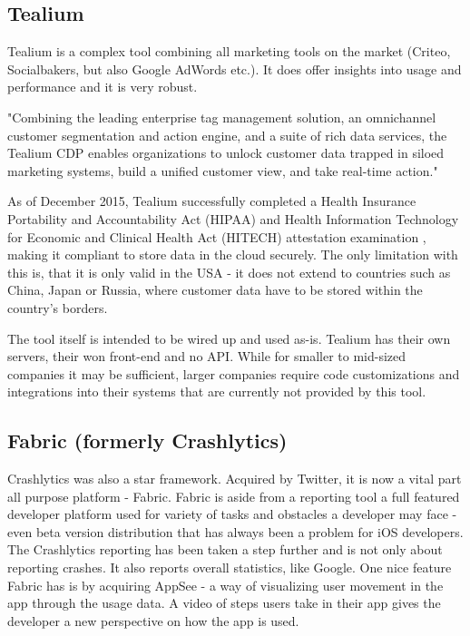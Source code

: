 \subsection{Tealium}

Tealium is a complex tool combining all marketing tools on the market (Criteo, Socialbakers, but also Google AdWords etc.). It does offer insights into usage and performance and it is very robust. 

\bigbreak

"Combining the leading enterprise tag management solution, an omnichannel customer segmentation and action engine, and a suite of rich data services, the Tealium CDP enables organizations to unlock customer data trapped in siloed marketing systems, build a unified customer view, and take real-time action." \cite{tealium}

\bigbreak

As of December 2015, Tealium successfully completed a Health Insurance Portability and Accountability Act (HIPAA) and Health Information Technology for Economic and Clinical Health Act (HITECH) attestation examination \cite{hipaa}, making it compliant to store data in the cloud securely. The only limitation with this is, that it is only valid in the USA - it does not extend to countries such as China, Japan or Russia, where customer data have to be stored within the country's borders.

The tool itself is intended to be wired up and used as-is. Tealium has their own servers, their won front-end and no API. While for smaller to mid-sized companies it may be sufficient, larger companies require code customizations and integrations into their systems that are currently not provided by this tool.

\subsection{Fabric (formerly Crashlytics)}

Crashlytics was also a star framework. Acquired by Twitter, it is now a vital part all purpose platform - Fabric. Fabric is aside from a reporting tool a full featured developer platform used for variety of tasks and obstacles a developer may face - even beta version distribution that has always been a problem for iOS developers. The Crashlytics reporting has been taken a step further and is not only about reporting crashes. It also reports overall statistics, like Google. One nice feature Fabric has is by acquiring AppSee - a way of visualizing user movement in the app through the usage data. A video of steps users take in their app gives the developer a new perspective on how the app is used.

